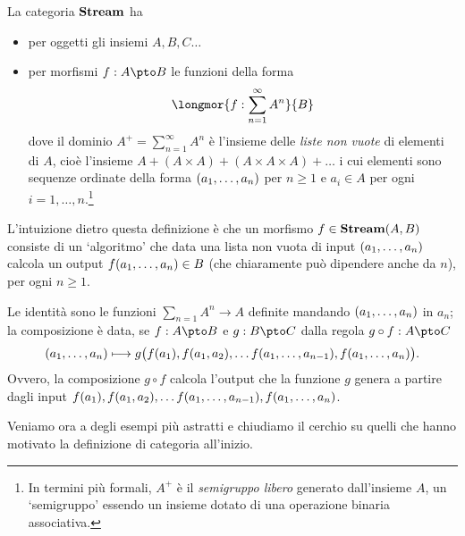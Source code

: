 \begin{example}\label{ex_cat_g_insiemi}
\end{example}
\begin{example}\label{example_streams}
	La categoria \(\mathbf{Stream}\) ha
	\begin{itemize}
		\item per oggetti gli insiemi \(A,B,C\dots\)
		\item per morfismi \(f : A\pto B\) le funzioni della forma
		      \[\longmor{f : \sum_{n=1}^\infty A^n}{B}\]
		      dove il dominio \(A^+=\sum_{n=1}^\infty A^n\) è l'insieme delle \emph{liste non vuote} di elementi di \(A\), cioè l'insieme \(A + (A\times A) + (A\times A\times A) + \dots\) i cui elementi sono sequenze ordinate della forma \((\tup an,)\) per \(n\ge 1\) e \(a_i\in A\) per ogni \(i=1,\dots,n\).\footnote{In termini più formali, \(A^+\) è il \emph{semigruppo libero} generato dall'insieme \(A\), un `semigruppo' essendo un insieme dotato di una operazione binaria associativa.}
	\end{itemize}
	L'intuizione dietro questa definizione è che un morfismo \(f \in \mathbf{Stream}(A,B)\) consiste di un `algoritmo' che data una lista non vuota di input \((\tup an,)\) calcola un output \(f(\tup an,)\in B\) (che chiaramente può dipendere anche da \(n\)), per ogni \(n\ge 1\).

	Le identità sono le funzioni \(\sum_{n=1} A^n\to A\) definite mandando \((\tup an,)\) in \(a_n\); la composizione è data, se \(f : A\pto B\) e \(g : B\pto C\) dalla regola \(g\circ f : A\pto C\)
	\[(\tup an,)\longmapsto g\big(f(a_1),f(a_1,a_2),\dots f(\tup a{n-1},),f(\tup an,)\big).\]
	Ovvero, la composizione \(g\circ f\) calcola l'output che la funzione \(g\) genera a partire dagli input \(f(a_1),f(a_1,a_2),\dots f(\tup a{n-1},),f(\tup an,)\).
\end{example}
Veniamo ora a degli esempi più astratti e chiudiamo il cerchio su quelli che hanno motivato la definizione di categoria all'inizio.

